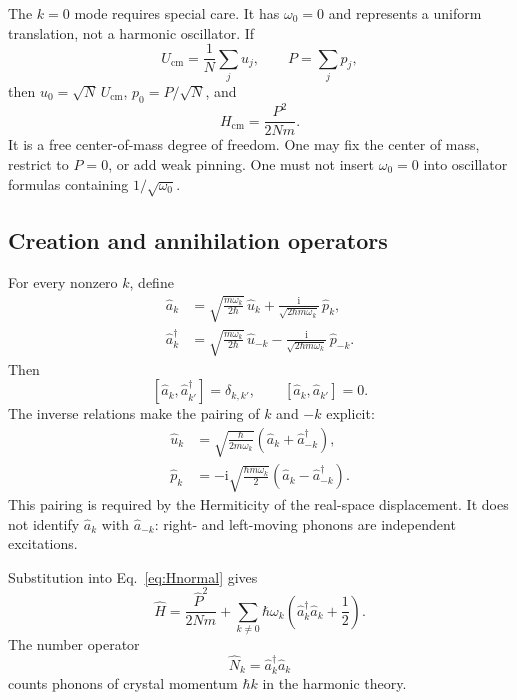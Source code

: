\documentclass[11pt]{article}
\newcommand{\ii}{\mathrm{i}}
\newcommand{\comm}[2]{\left[#1,#2\right]}
\begin{document}
The $k=0$ mode requires special care.  It has $\omega_0=0$ and represents a
uniform translation, not a harmonic oscillator.  If
\begin{equation}
  U_{\mathrm{cm}}=\frac1N\sum_j u_j,
  \qquad
  P=\sum_jp_j,
\end{equation}
then $u_0=\sqrt N\,U_{\mathrm{cm}}$, $p_0=P/\sqrt N$, and
\begin{equation}
  H_{\mathrm{cm}}=\frac{P^2}{2Nm}.
  \label{eq:Hcm}
\end{equation}
It is a free center-of-mass degree of freedom.  One may fix the center of
mass, restrict to $P=0$, or add weak pinning.  One must not insert
$\omega_0=0$ into oscillator formulas containing $1/\sqrt{\omega_0}$.

\subsection{Creation and annihilation operators}

For every nonzero $k$, define
\begin{align}
  \hat a_k
  &=\sqrt{\frac{m\omega_k}{2\hbar}}\,\hat u_k
  +\frac{\ii}{\sqrt{2\hbar m\omega_k}}\,\hat p_k,
  \label{eq:akdef}
  \\
  \hat a_k^\dagger
  &=\sqrt{\frac{m\omega_k}{2\hbar}}\,\hat u_{-k}
  -\frac{\ii}{\sqrt{2\hbar m\omega_k}}\,\hat p_{-k}.
  \label{eq:akdagdef}
\end{align}
Then
\begin{equation}
  \comm{\hat a_k}{\hat a_{k'}^\dagger}=\delta_{k,k'},
  \qquad
  \comm{\hat a_k}{\hat a_{k'}}=0.
  \label{eq:bosonCCR}
\end{equation}
The inverse relations make the pairing of $k$ and $-k$ explicit:
\begin{align}
  \hat u_k
  &=\sqrt{\frac{\hbar}{2m\omega_k}}
  \left(\hat a_k+\hat a_{-k}^\dagger\right),
  \label{eq:ukladder}
  \\
  \hat p_k
  &=-\ii\sqrt{\frac{\hbar m\omega_k}{2}}
  \left(\hat a_k-\hat a_{-k}^\dagger\right).
  \label{eq:pkladder}
\end{align}
This pairing is required by the Hermiticity of the real-space displacement.
It does not identify $\hat a_k$ with $\hat a_{-k}$: right- and left-moving
phonons are independent excitations.

Substitution into Eq.~\eqref{eq:Hnormal} gives
\begin{equation}
  \boxed{
  \hat H
  =\frac{\hat P^2}{2Nm}
  +\sum_{k\neq0}\hbar\omega_k
  \left(\hat a_k^\dagger\hat a_k+\frac12\right).
  }
  \label{eq:quantumH}
\end{equation}
The number operator
\begin{equation}
  \hat N_k=\hat a_k^\dagger\hat a_k
\end{equation}
counts phonons of crystal momentum $\hbar k$ in the harmonic theory.
\end{document}
